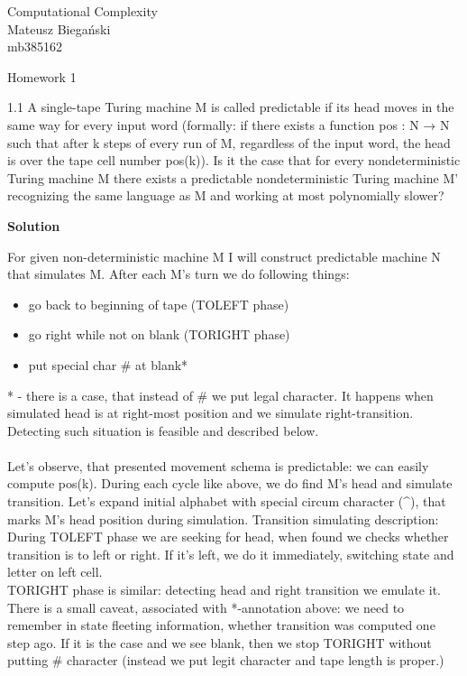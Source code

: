 \documentclass[12pt]{article}
\begin{document}

\begin{flushright}
    Computational Complexity \\
    Mateusz Biegański \\ 
    mb385162
\end{flushright}

\begin{center}
    \Large Homework 1 \normalsize
\end{center}

1.1    A single-tape Turing machine M is called predictable if its head moves
in the same way for every input word (formally: if there exists a function pos : N → N such
that after k steps of every run of M, regardless of the input word, the head is over the tape cell
number pos(k)). Is it the case that for every nondeterministic Turing machine M there exists
a predictable nondeterministic Turing machine M'
recognizing the same language as M and
working at most polynomially slower?

{\bf Solution}

For given non-deterministic machine M I will construct predictable machine N that simulates M. After each M's turn we do following things:
\begin{itemize}
    \item go back to beginning of tape (TOLEFT phase)
    \item go right while not on blank (TORIGHT phase)
    \item put special char \# at blank*
\end{itemize}
* - there is a case, that instead of \# we put legal character. It happens when simulated head is at right-most position and we simulate right-transition. Detecting such situation is feasible and described below. \\\\
Let's observe, that presented movement schema is predictable: we can easily compute pos(k).
During each cycle like above, we do find M's head and simulate transition. Let's expand initial alphabet with special circum character (\textasciicircum ), that marks M's head position during simulation. 
Transition simulating description:
During TOLEFT phase we are seeking for head, when found we checks whether transition is to left or right. If it's left, we do it immediately, switching state and letter on left cell.
\\
TORIGHT phase is similar: detecting head and right transition we emulate it. There is a small caveat, associated with *-annotation above: we need to remember in state fleeting information, whether transition was computed one step ago. If it is the case and we see blank, then we stop TORIGHT without putting \# character (instead we put legit character and tape length is proper.)
\end{document}
